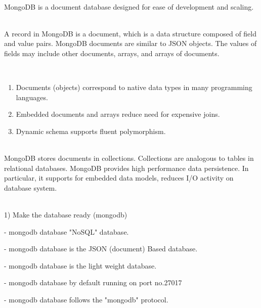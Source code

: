\documentclass{article}
\begin{document}
\noindent \textbf{}

\noindent \\ MongoDB is a document database designed for ease of development and scaling.

\noindent 

\noindent \\ A record in MongoDB is a document, which is a data structure composed of field and value pairs. MongoDB documents are similar to JSON objects. The values of fields may include other documents, arrays, and arrays of documents.

\noindent 

\noindent 

\noindent \\ \textbf{}

\begin{enumerate}
\item \textbf{\underbar{ }}Documents (objects) correspond to native data types in many programming languages.

\item  Embedded documents and arrays reduce need for expensive joins.

\item  Dynamic schema supports fluent polymorphism.
\end{enumerate}

\noindent 

\noindent 

\noindent \\ MongoDB stores documents in collections. Collections are analogous to tables in relational databases. MongoDB provides high performance data persistence. In particular, it supports for embedded data models, reduces I/O activity on database system.

\noindent 

\noindent 

\noindent \\ 1) Make the database ready (mongodb)

\noindent     - mongodb database "NoSQL" database.

\noindent     - mongodb database is the JSON (document) Based database.

\noindent     - mongodb database is the light weight database.

\noindent     - mongodb database by default running on port no.27017

\noindent     - mongodb database follows the "mongodb" protocol.
\end{document}
